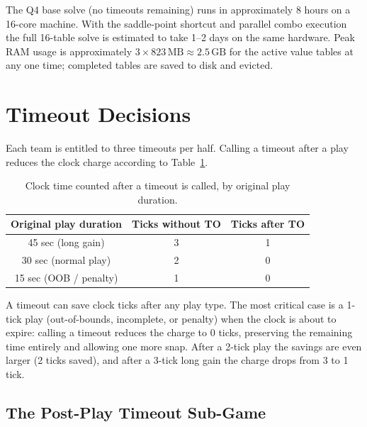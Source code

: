 \documentclass[11pt,letterpaper]{article}
\begin{document}
The Q4 base solve (no timeouts remaining) runs in approximately 8 hours on a 16-core
machine.  With the saddle-point shortcut and parallel combo execution the full 16-table
solve is estimated to take 1--2 days on the same hardware.  Peak RAM usage is
approximately $3 \times 823\,\text{MB} \approx 2.5\,\text{GB}$ for the active value
tables at any one time; completed tables are saved to disk and evicted.

\section{Timeout Decisions}
\label{sec:timeouts}

Each team is entitled to three timeouts per half.  Calling a timeout after a play reduces
the clock charge according to Table~\ref{tab:to}.

\begin{table}[ht]
\centering
\caption{Clock time counted after a timeout is called, by original play duration.}
\label{tab:to}
\begin{tabular}{ccc}
\toprule
Original play duration & Ticks without TO & Ticks after TO \\
\midrule
45 sec (long gain)      & 3 & 1 \\
30 sec (normal play)    & 2 & 0 \\
15 sec (OOB / penalty)  & 1 & 0 \\
\end{tabular}
\end{table}

\noindent A timeout can save clock ticks after any play type.  The most critical case
is a 1-tick play (out-of-bounds, incomplete, or penalty) when the clock is about to
expire: calling a timeout reduces the charge to 0 ticks, preserving the remaining
time entirely and allowing one more snap.  After a 2-tick play the savings are even
larger (2 ticks saved), and after a 3-tick long gain the charge drops from 3 to 1 tick.

\subsection{The Post-Play Timeout Sub-Game}
\end{document}
